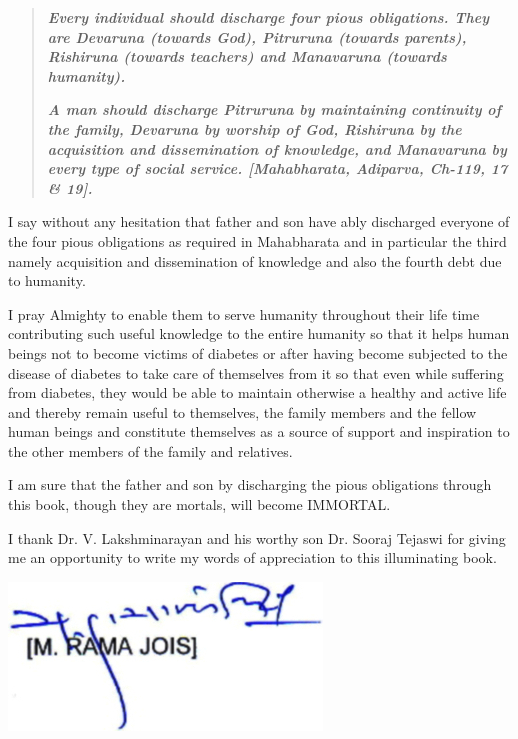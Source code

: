 \begin{quote}
\textit{\textbf{Every individual should discharge four pious obligations. They are Devaruna (towards God), Pitruruna (towards parents), Rishiruna (towards teachers) and Manavaruna (towards humanity).}}

\textit{\textbf{A man should discharge Pitruruna by maintaining continuity of the family, Devaruna by worship of God, Rishiruna by the acquisition and dissemination of knowledge, and Manavaruna by every type of social service. [Mahabharata, Adiparva, Ch-119, 17 \& 19].}}
\end{quote}

I say without any hesitation that father and son have ably discharged everyone of the four pious obligations as required in Mahabharata and in particular the third namely acquisition and dissemination of knowledge and also the fourth debt due to humanity.

I pray Almighty to enable them to serve humanity throughout their life time contributing such useful knowledge to the entire humanity so that it helps human beings not to become victims of diabetes or after having become subjected to the disease of diabetes to take care of themselves from it so that even while suffering from diabetes, they would be able to maintain otherwise a healthy and active life and thereby remain useful to themselves, the family members and the fellow human beings and constitute themselves as a source of support and inspiration to the other members of the family and relatives.

I am sure that the father and son by discharging the pious obligations through this book, though they are mortals, will become IMMORTAL.

I thank Dr. V. Lakshminarayan and his worthy son Dr. Sooraj Tejaswi for giving me an opportunity to write my words of appreciation to this illuminating book.

\begin{flushright}
\includegraphics[scale=2]{images/003a.jpg}
\end{flushright}

